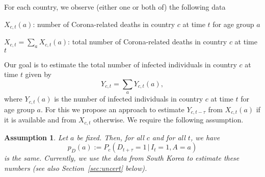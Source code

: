 \documentclass[a4paper]{article}
\newtheorem{ass}{Assumption}
\renewcommand\P{\mathbb{P}}
\newcommand{\given}{\, \vert \,}
\begin{document}

For each country, we observe (either one or both of) the following data
\begin{compactitem}
\item $X_{c,t}(a)$: number of Corona-related deaths in country $c$ at
  time $t$ for age group $a$
\item $X_{c,t} = \sum_a X_{c,t}(a)$: total number of Corona-related
  deaths in country $c$ at time $t$
\end{compactitem}
Our goal is to estimate the total number of infected
individuals in country $c$ at time $t$ given by
$$Y_{c,t} = \sum_a Y_{c,t}(a),$$ where $Y_{c,t}(a)$ is the number of
infected individuals in country $c$ at time $t$ for age group $a$.
For this we propose an approach to estimate $Y_{c,t-\tau}$ from
$X_{c,t}(a)$ if it is available and from $X_{c,t}$ otherwise. We require the following assumption.


\begin{ass}
Let $a$ be fixed. Then, for all $c$ and for
all $t$, we have
\begin{equation*}
p_D(a) := P_c(D_{t+\tau} = 1\,|\,I_t = 1, A = a)
\end{equation*}
is the same. 
Currently, we use the data from South Korea to 
estimate these numbers (see also Section~\ref{sec:uncert} below). 
\end{ass}
\end{document}
